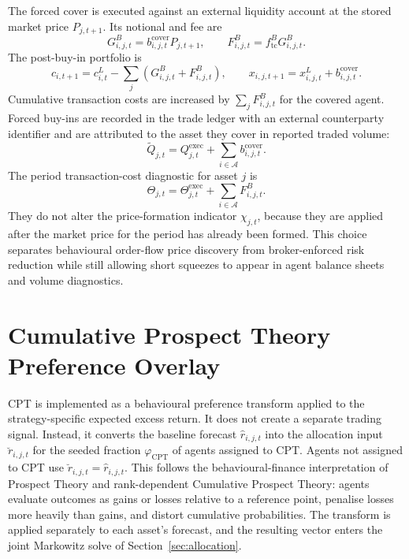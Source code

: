 \documentclass[12pt, a4paper]{article}
\begin{document}
    The forced cover is executed against an external liquidity account at the
    stored market price \(P_{j,t+1}\). Its notional and fee are
    \[
        G_{i,j,t}^{B}=b_{i,j,t}^{\text{cover}}P_{j,t+1},
        \qquad
        F_{i,j,t}^{B}=f_{\mathrm{tc}}^{B}G_{i,j,t}^{B}.
    \]
    The post-buy-in portfolio is
    \[
        c_{i,t+1}=c_{i,t}^{L}-\sum_{j}\left(G_{i,j,t}^{B}+F_{i,j,t}^{B}\right),
        \qquad
        x_{i,j,t+1}=x_{i,j,t}^{L}+b_{i,j,t}^{\text{cover}}.
    \]
    Cumulative transaction costs are increased by \(\sum_j F_{i,j,t}^{B}\) for the
    covered agent.
    Forced buy-ins are recorded in the trade ledger with an external counterparty
    identifier and are attributed to the asset they cover in reported traded
    volume:
    \[
        \widetilde Q_{j,t}
        =
        Q_{j,t}^{\text{exec}}
        +
        \sum_{i\in\mathcal{A}} b_{i,j,t}^{\text{cover}}.
    \]
    The period transaction-cost diagnostic for asset \(j\) is
    \[
        \Theta_{j,t}=\Theta_{j,t}^{\mathrm{exec}}+\sum_{i\in\mathcal{A}}F_{i,j,t}^{B}.
    \]
    They do not alter the price-formation indicator \(\chi_{j,t}\), because they
    are applied after the market price for the period has already been formed. This
    choice separates behavioural order-flow price discovery from broker-enforced
    risk reduction while still allowing short squeezes to appear in agent balance
    sheets and volume diagnostics.

    \section{Cumulative Prospect Theory Preference Overlay}\label{sec:cpt}

    CPT is implemented as a behavioural preference transform applied to the
    strategy-specific expected excess return. It does not create a separate trading
    signal. Instead, it converts the baseline forecast \(\hat r_{i,j,t}\) into the
    allocation input \(\breve r_{i,j,t}\) for the seeded fraction
    \(\varphi_{\mathrm{CPT}}\) of agents assigned to CPT\@. Agents not assigned to
    CPT use \(\breve r_{i,j,t}=\hat r_{i,j,t}\). This follows the
    behavioural-finance interpretation of Prospect Theory and rank-dependent
    Cumulative Prospect Theory: agents evaluate outcomes as gains or losses
    relative to a reference point, penalise losses more heavily than gains, and
    distort cumulative probabilities. The transform is applied separately to each
    asset's forecast, and the resulting vector enters the joint Markowitz solve of
    Section~\ref{sec:allocation}.
\end{document}
